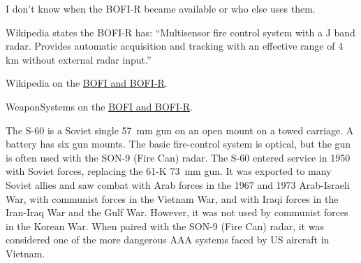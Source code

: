 \begin{withcounters}
{        I don't know when the BOFI-R became available or who else uses them.

        Wikipedia states the BOFI-R has: “Multisensor fire control system with a J band radar. Provides automatic acquisition and tracking with an effective range of 4 km without external radar input.”

        \begin{notesources}
            \item Wikipedia on the \href{https://en.wikipedia.org/wiki/Bofors_40_mm_Automatic_Gun_L/70}{BOFI and BOFI-R}.
            \item WeaponSystems on the \href{https://weaponsystems.net/system/932-Bofors\%20L/70}{BOFI and BOFI-R}.
        \end{notesources}
    }


    The S-60 is a Soviet single 57~mm gun on an open mount on a towed carriage.
    A battery has six gun mounts.
    The basic fire-control system is optical, but the gun is often used with the SON-9 (Fire Can) radar.
    The S-60 entered service in 1950 with Soviet forces, replacing the 61-K 73~mm gun.
    It was exported to many Soviet allies and saw combat with Arab forces in the 1967 and 1973 Arab-Israeli War, with communist forces in the Vietnam War, and with Iraqi forces in the Iran-Iraq War and the Gulf War. However, it was not used by communist forces in the Korean War. When paired with the SON-9 (Fire Can) radar, it was considered one of the more dangerous AAA systems faced by US aircraft in Vietnam.%


\end{withcounters}
